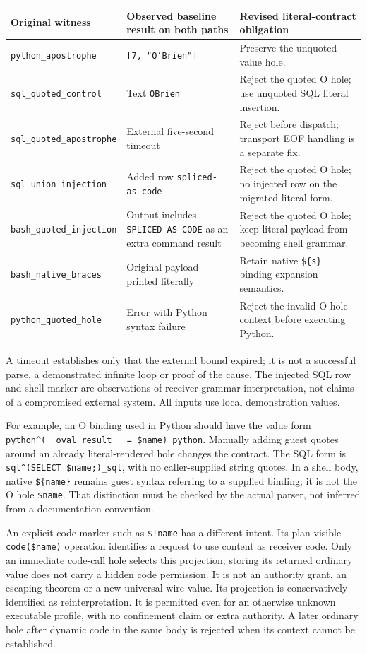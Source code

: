\documentclass[11pt]{article}
\begin{document}
{\small
\begin{tabularx}{\linewidth}{YYY}
\toprule
Original witness & Observed baseline result on both paths & Revised literal-contract obligation \\
\midrule
\texttt{python\_apostrophe} & \texttt{[7, "O'Brien"]} & Preserve the unquoted value hole. \\
\texttt{sql\_quoted\_control} & Text \texttt{OBrien} & Reject the quoted O hole; use unquoted SQL literal insertion. \\
\texttt{sql\_quoted\_apostrophe} & External five-second timeout & Reject before dispatch; transport EOF handling is a separate fix. \\
\texttt{sql\_union\_injection} & Added row \texttt{spliced-as-code} & Reject the quoted O hole; no injected row on the migrated literal form. \\
\texttt{bash\_quoted\_injection} & Output includes \texttt{SPLICED-AS-CODE} as an extra command result & Reject the quoted O hole; keep literal payload from becoming shell grammar. \\
\texttt{bash\_native\_braces} & Original payload printed literally & Retain native \texttt{\$\{s\}} binding expansion semantics. \\
\texttt{python\_quoted\_hole} & Error with Python syntax failure & Reject the invalid O hole context before executing Python. \\
\bottomrule
\end{tabularx}
}


A timeout establishes only that the external bound expired; it is not a successful parse, a demonstrated infinite loop or proof of the cause. The injected SQL row and shell marker are observations of receiver-grammar interpretation, not claims of a compromised external system. All inputs use local demonstration values.

For example, an O binding used in Python should have the value form \texttt{python\textasciicircum{}(\_\_oval\_result\_\_ = \$name)\_python}. Manually adding guest quotes around an already literal-rendered hole changes the contract. The SQL form is \texttt{sql\textasciicircum{}(SELECT \$name;)\_sql}, with no caller-supplied string quotes. In a shell body, native \texttt{\$\{name\}} remains guest syntax referring to a supplied binding; it is not the O hole \texttt{\$name}. That distinction must be checked by the actual parser, not inferred from a documentation convention.

An explicit code marker such as \texttt{\$!name} has a different intent. Its plan-visible \texttt{code(\$name)} operation identifies a request to use content as receiver code. Only an immediate code-call hole selects this projection; storing its returned ordinary value does not carry a hidden code permission. It is not an authority grant, an escaping theorem or a new universal wire value. Its projection is conservatively identified as reinterpretation. It is permitted even for an otherwise unknown executable profile, with no confinement claim or extra authority. A later ordinary hole after dynamic code in the same body is rejected when its context cannot be established.
\end{document}
